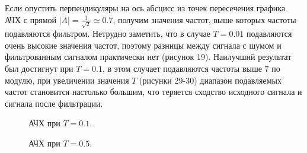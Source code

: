 \documentclass[a5paper, 10pt]{article}
\theoremstyle{definition}
\theoremstyle{plain}
\theoremstyle{remark}
\begin{document}
Если опустить перпендикуляры на ось абсцисс из точек пересечения графика АЧХ с прямой $|A| = \frac{1}{\sqrt{2}} \simeq 0.7$, получим значения частот, выше которых частоты подавляются фильтром. Нетрудно заметить, что в случае $T=0.01$ подавляются очень высокие значения частот, поэтому разницы между сигнала с шумом и фильтрованным сигналом практически нет (рисунок 19). Наилучший результат был достигнут при $T=0.1$, в этом случает подавляются частоты выше $7$ по модулю, при увеличении значения $T$ (рисунки 29-30) диапазон подавляемых частот становится настолько большим, что теряется сходство исходного сигнала и сигнала после фильтрации.

\begin{figure}[h!]
\caption{АЧХ при $T = 0.1$.}
\caption{АЧХ при $T = 0.5$.}
\end{figure}
\end{document}
